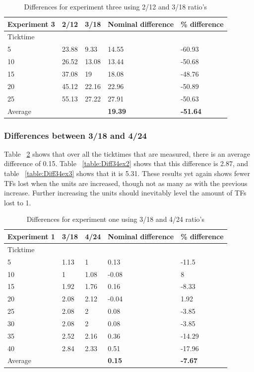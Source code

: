 \begin{table}[!htbp]
\begin{tabular}{| l | l | l | l | l |}
\hline
Experiment 3 & 2/12 & 3/18 & Nominal difference & \% difference \\ \hline
Ticktime &&&& \\ \hline
5 & 23.88 & 9.33 & 14.55 & -60.93 \\ \hline
10 & 26.52 & 13.08 & 13.44 & -50.68 \\ \hline
15 & 37.08 & 19 & 18.08 & -48.76 \\ \hline
20 & 45.12 & 22.16 & 22.96 & -50.89 \\ \hline
25 & 55.13 & 27.22 & 27.91 & -50.63 \\ \hline \hline
Average &&& \textbf{19.39} & \textbf{-51.64} \\ \hline
\end{tabular}
\caption{Differences for experiment three using 2/12 and 3/18 ratio's}
\label{table:Diff23ex3}
\end{table}

\subsubsection*{Differences between 3/18 and 4/24}
Table ~\ref{table:Diff34ex1} shows that over all the ticktimes that are measured, there is an average difference of 0.15. Table ~\ref{table:Diff34ex2} shows that this difference is 2.87, and table ~\ref{table:Diff34ex3} shows that it is 5.31. These results yet again shows fewer TFs lost when the units are increased, though not as many as with the previous increase. Further increasing the units should inevitably level the amount of TFs lost to 1.

\begin{table}[!htbp]
\begin{tabular}{| l | l | l | l | l |}
\hline
Experiment 1 & 3/18 & 4/24 & Nominal difference & \% difference \\ \hline
Ticktime &&&& \\ \hline
5 & 1.13 & 1 & 0.13 & -11.5 \\ \hline
10 & 1 & 1.08 & -0.08 & 8 \\ \hline
15 & 1.92 & 1.76 & 0.16 & -8.33 \\ \hline
20 & 2.08 & 2.12 & -0.04 & 1.92 \\ \hline
25 & 2.08 & 2 & 0.08 & -3.85 \\ \hline
30 & 2.08 & 2 & 0.08 & -3.85 \\ \hline
35 & 2.52 & 2.16 & 0.36 & -14.29 \\ \hline
40 & 2.84 & 2.33 & 0.51 & -17.96 \\ \hline \hline
Average &&& \textbf{0.15} & \textbf{-7.67} \\ \hline
\end{tabular}
\caption{Differences for experiment one using 3/18 and 4/24 ratio's}
\label{table:Diff34ex1}
\end{table}

